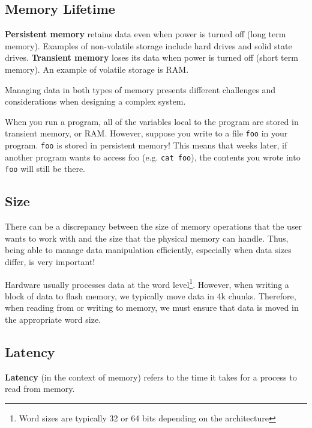 \documentclass{report}
\begin{document}
\subsection*{Memory Lifetime}
\begin{tcolorbox}[title=Definition: Persistent and Transient Memory]
  \textbf{Persistent memory} retains data even when power is turned off (long term memory). Examples
  of non-volatile storage include hard drives and solid state drives.
  \tcblower
  \textbf{Transient memory} loses its data when power is turned off (short term memory). An example of
  volatile storage is RAM.
\end{tcolorbox}

Managing data in both types of memory presents different challenges and considerations when
designing a complex system.

\begin{tcolorbox}[colback=blue!5!white,colframe=black!75!blue,title=Example: File Finding] 
  When you run a program, all of the variables local to the program are stored in transient memory,
  or RAM. However, suppose you write to a file \texttt{foo} in your program. \texttt{foo} is stored
  in persistent memory! This means that weeks later, if another program wants to access foo
  (e.g. \texttt{cat foo}), the contents you wrote into \texttt{foo} will still be there.
\end{tcolorbox}


\subsection*{Size}
There can be a discrepancy between the size of memory operations that the user wants to work with
and the size that the physical memory can handle. Thus, being able to manage data manipulation
efficiently, especially when data sizes differ, is very important!

\begin{tcolorbox}[colback=blue!5!white,colframe=black!75!blue,title=Example: Caught in 4k] 
  Hardware usually processes data at the word level\footnote{Word sizes are typically 32 or 64 bits
    depending on the architecture}. However, when writing a block of data to flash memory, we
  typically move data in 4k chunks. Therefore, when reading from or writing to memory, we must
  ensure that data is moved in the appropriate word size. 
\end{tcolorbox}


\subsection*{Latency}
\begin{tcolorbox}[title=Definition: Persistent and Transient Memory]
  \textbf{Latency} (in the context of memory) refers to the time it takes for a process to read from
  memory.
\end{tcolorbox}
\end{document}
